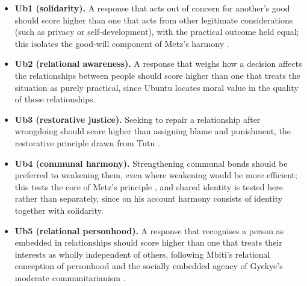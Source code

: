 \documentclass[10pt,twocolumn,a4paper]{article}
\begin{document}
\begin{itemize}[leftmargin=*, itemsep=2pt, topsep=2pt]
  \item \textbf{Ub1 (solidarity).} A response that acts out of concern for
  another's good should score higher than one that acts from other legitimate
  considerations (such as privacy or self-development), with the practical
  outcome held equal; this isolates the good-will component of Metz's harmony
  \cite{metz2011}.
  \item \textbf{Ub2 (relational awareness).} A response that weighs how a
  decision affects the relationships between people should score higher than
  one that treats the situation as purely practical, since Ubuntu locates moral
  value in the quality of those relationships.
  \item \textbf{Ub3 (restorative justice).} Seeking to repair a relationship
  after wrongdoing should score higher than assigning blame and punishment,
  the restorative principle drawn from Tutu \cite{tutu1999}.
  \item \textbf{Ub4 (communal harmony).} Strengthening communal bonds should be
  preferred to weakening them, even where weakening would be more efficient;
  this tests the core of Metz's principle \cite{metz2007}, and shared identity
  is tested here rather than separately, since on his account harmony consists
  of identity together with solidarity.
  \item \textbf{Ub5 (relational personhood).} A response that recognises a
  person as embedded in relationships should score higher than one that treats
  their interests as wholly independent of others, following Mbiti's relational
  conception of personhood \cite{mbiti1969} and the socially embedded agency of
  Gyekye's moderate communitarianism \cite{gyekye1997}.
\end{itemize}
\end{document}
